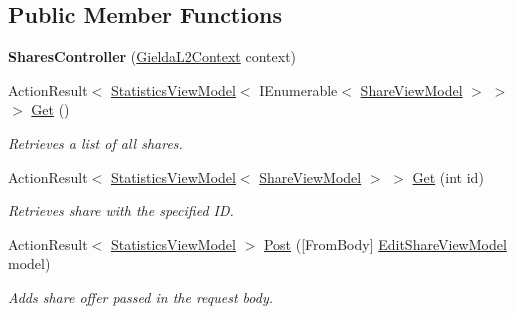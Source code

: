\subsection*{Public Member Functions}
\begin{DoxyCompactItemize}
\item 
\mbox{\label{class_gielda_l2_1_1_a_p_i_1_1_controllers_1_1_shares_controller_afd9ae90fe8099f573da8a6d7495ab946}} 
{\bfseries Shares\+Controller} (\mbox{\hyperlink{class_gielda_l2_1_1_d_b_1_1_gielda_l2_context}{Gielda\+L2\+Context}} context)
\item 
Action\+Result$<$ \mbox{\hyperlink{class_gielda_l2_1_1_a_p_i_1_1_view_models_1_1_view_1_1_statistics_view_model}{Statistics\+View\+Model}}$<$ I\+Enumerable$<$ \mbox{\hyperlink{class_gielda_l2_1_1_a_p_i_1_1_view_models_1_1_view_1_1_share_view_model}{Share\+View\+Model}} $>$ $>$ $>$ \mbox{\hyperlink{class_gielda_l2_1_1_a_p_i_1_1_controllers_1_1_shares_controller_a7a4e1916ed4b83d7cacfb17d0e1e56de}{Get}} ()
\begin{DoxyCompactList}\small\item\em Retrieves a list of all shares. \end{DoxyCompactList}\item 
Action\+Result$<$ \mbox{\hyperlink{class_gielda_l2_1_1_a_p_i_1_1_view_models_1_1_view_1_1_statistics_view_model}{Statistics\+View\+Model}}$<$ \mbox{\hyperlink{class_gielda_l2_1_1_a_p_i_1_1_view_models_1_1_view_1_1_share_view_model}{Share\+View\+Model}} $>$ $>$ \mbox{\hyperlink{class_gielda_l2_1_1_a_p_i_1_1_controllers_1_1_shares_controller_acb86566291d689294a362a56accaa2a0}{Get}} (int id)
\begin{DoxyCompactList}\small\item\em Retrieves share with the specified ID. \end{DoxyCompactList}\item 
Action\+Result$<$ \mbox{\hyperlink{class_gielda_l2_1_1_a_p_i_1_1_view_models_1_1_view_1_1_statistics_view_model}{Statistics\+View\+Model}} $>$ \mbox{\hyperlink{class_gielda_l2_1_1_a_p_i_1_1_controllers_1_1_shares_controller_a7b313a2208fd8c9f5c942ccdb874ac49}{Post}} (\mbox{[}From\+Body\mbox{]} \mbox{\hyperlink{class_gielda_l2_1_1_a_p_i_1_1_view_models_1_1_edit_1_1_edit_share_view_model}{Edit\+Share\+View\+Model}} model)
\begin{DoxyCompactList}\small\item\em Adds share offer passed in the request body. \end{DoxyCompactList}\item 

\end{DoxyCompactItemize}
